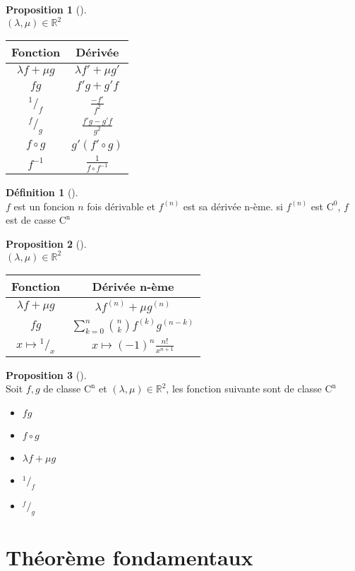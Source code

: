 \documentclass{article}
\newcommand{\R}{\mathbb{R}}
\newcommand{\co}[1]{\mathrm{C^{#1}}}
\theoremstyle{definition}
\newtheorem*{prop}{Proposition}
\newtheorem*{defin}{Définition}
\theoremstyle{remark}
\theoremstyle{plain}
\newenvironment{prp}[1][]
{\begin{prop}[#1]\quad\\}
{\end{prop}}
\newenvironment{dfn}[1][]
{\begin{defin}[#1]\quad\\}
{\end{defin}}
\begin{document}
\begin{prp}
$(\lambda, \mu) \in \R^2$ \\
\begin{tabular}{c|c}
Fonction &  Dérivée \\
\hline
$\lambda f + \mu g$ & $\lambda f' + \mu g'$ \\
$fg$ & $f'g + g'f$ \\
$^1/_f$ & $\frac{-f'}{f^2}$ \\
$^f/_g$ & $\frac{f'g - g'f}{g^2}$ \\
$f\circ g$ & $g'(f'\circ g)$ \\
$f^{-1}$ & $\frac{1}{f\circ f^{-1}}$ \\
\end{tabular}
\end{prp}

\begin{dfn}
$f$ est un foncion $n$ fois dérivable et $f^{(n)}$ est sa dérivée n-ème.
si $f^{(n)}$ est $\co{0}$, $f$ est de casse $\co{n}$
\end{dfn}

\begin{prp}
$(\lambda, \mu) \in \R^2$ \\
\begin{tabular}{c|c}
Fonction & Dérivée n-ème \\
\hline
$\lambda f + \mu g$ & $\lambda f^{(n)} + \mu g^{(n)}$ \\
$fg$ & $\sum_{k = 0}^{n} \binom{n}{k} f^{(k)}g^{(n - k)}$ \\
$x \mapsto {^1/_x}$ & $x \mapsto (-1)^n \frac{n!}{x^{n + 1}}$ \\
\end{tabular}
\end{prp}

\begin{prp}
Soit $f, g$ de classe $\co{n}$ et $(\lambda, \mu) \in \R^2$,
les fonction suivante sont de classe $\co{n}$
\begin{itemize}
    \item $fg$
    \item $f \circ g$
    \item $\lambda f + \mu g$
    \item $^1/_f$
    \item $^f/_g$
\end{itemize}
\end{prp}

\section{Théorème fondamentaux}
\end{document}
